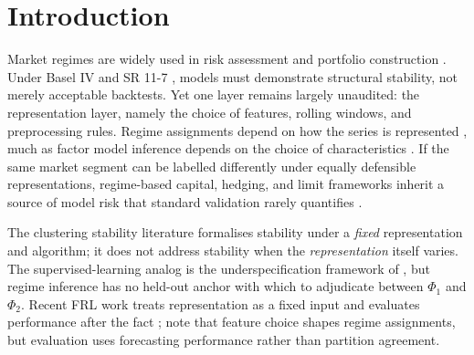 \documentclass[preprint,12pt,authoryear]{elsarticle}
\begin{document}
\section{Introduction}

Market regimes are widely used in risk assessment and portfolio construction \citep{Hamilton1989}. Under Basel IV and SR 11-7 \citep{SR117}, models must demonstrate structural stability, not merely acceptable backtests. Yet one layer remains largely unaudited: the representation layer, namely the choice of features, rolling windows, and preprocessing rules. Regime assignments depend on how the series is represented \citep{BengioCourvilleVincent2013}, much as factor model inference depends on the choice of characteristics \citep{GuKellyXiu2020,KellyPruittSu2019}. If the same market segment can be labelled differently under equally defensible representations, regime-based capital, hedging, and limit frameworks inherit a source of model risk that standard validation rarely quantifies \citep{DanielssonJamesValenzuelaZer2016}.

The clustering stability literature \citep{BenDavidLuxburgPal06,vonLuxburg2010} formalises stability under a \emph{fixed} representation and algorithm; it does not address stability when the \emph{representation} itself varies. The supervised-learning analog is the underspecification framework of \citet{DAmouretal2022}, but regime inference has no held-out anchor with which to adjudicate between $\Phi_1$ and $\Phi_2$. Recent FRL work treats representation as a fixed input and evaluates performance after the fact \citep{Kirby2023FRL,BlazsekKongShadoff2025,Ampountolas2025FRL,WangYuanQu2025FRL}; \citet{Ampountolas2025FRL} note that feature choice shapes regime assignments, but evaluation uses forecasting performance rather than partition agreement.
\end{document}
